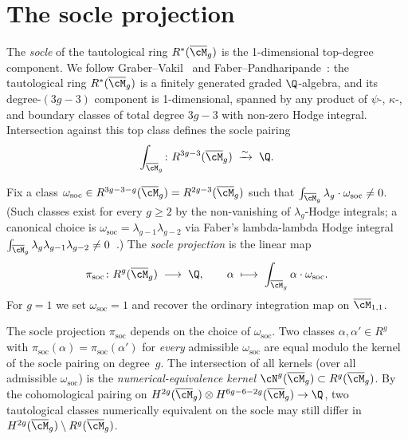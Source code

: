 \section{The socle projection}
\label{sec:socle-projection}

The \emph{socle} of the tautological ring
$R^*(\overline{\cM}_g)$ is the 1-dimensional top-degree component.
We follow Graber--Vakil~\cite{GraVak05} and
Faber--Pandharipande~\cite{FP00}: the tautological ring
$R^*(\overline{\cM}_g)$ is a finitely generated graded
$\Q$-algebra, and its degree-$(3g-3)$ component is 1-dimensional,
spanned by any product of $\psi$-, $\kappa$-, and boundary classes
of total degree $3g-3$ with non-zero Hodge integral. Intersection
against this top class defines the socle pairing
\[
\int_{\overline{\cM}_g}\colon R^{3g-3}(\overline{\cM}_g)
\;\xrightarrow{\sim}\; \Q.
\]

\begin{definition}\label{def:socle-projection}
Fix a class $\omega_{\mathrm{soc}} \in R^{3g-3-g}(\overline{\cM}_g)
= R^{2g-3}(\overline{\cM}_g)$ such that
$\int_{\overline{\cM}_g} \lambda_g \cdot \omega_{\mathrm{soc}} \neq 0$.
(Such classes exist for every $g\geq 2$ by the non-vanishing of
$\lambda_g$-Hodge integrals; a canonical choice is
$\omega_{\mathrm{soc}} = \lambda_{g-1}\lambda_{g-2}$ via
Faber's lambda-lambda Hodge integral
$\int_{\overline{\cM}_g}\lambda_g\lambda_{g-1}\lambda_{g-2}
\neq 0$~\cite{FP00}.)
The \emph{socle projection} is the linear map
\[
\pi_{\mathrm{soc}}\colon R^{g}(\overline{\cM}_g) \;\longrightarrow\; \Q,
\qquad
\alpha \;\longmapsto\;
\int_{\overline{\cM}_g} \alpha \cdot \omega_{\mathrm{soc}}.
\]
For $g = 1$ we set $\omega_{\mathrm{soc}} = 1$ and recover the
ordinary integration map on $\overline{\cM}_{1,1}$.
\end{definition}

\begin{remark}
\label{rem:socle-projection-choice}
The socle projection $\pi_{\mathrm{soc}}$ depends on the choice of
$\omega_{\mathrm{soc}}$. Two classes $\alpha, \alpha' \in R^g$ with
$\pi_{\mathrm{soc}}(\alpha) = \pi_{\mathrm{soc}}(\alpha')$ for
\emph{every} admissible $\omega_{\mathrm{soc}}$ are equal modulo the
kernel of the socle pairing on degree~$g$. The intersection of all
kernels (over all admissible $\omega_{\mathrm{soc}}$) is the
\emph{numerical-equivalence kernel}
$\cN^g(\overline{\cM}_g) \subset R^g(\overline{\cM}_g)$. By the
cohomological pairing on $H^{2g}(\overline{\cM}_g)\otimes
H^{6g-6-2g}(\overline{\cM}_g) \to \Q$, two tautological classes
numerically equivalent on the socle may still differ in
$H^{2g}(\overline{\cM}_g) \setminus R^g(\overline{\cM}_g)$.
\end{remark}


